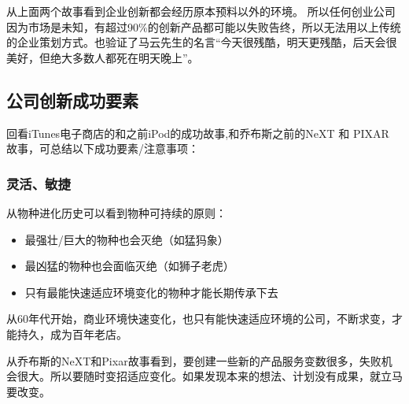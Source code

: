 

从上面两个故事看到企业创新都会经历原本预料以外的环境。
所以任何创业公司因为市场是未知，有超过90\%的创新产品都可能以失败告终，所以无法用以上传统的企业策划方式。也验证了马云先生的名言``今天很残酷，明天更残酷，后天会很美好，但绝大多数人都死在明天晚上''。

\hypertarget{ux516cux53f8ux521bux65b0ux6210ux529fux8981ux7d20}{%
\subsection{公司创新成功要素}\label{ux516cux53f8ux521bux65b0ux6210ux529fux8981ux7d20}}

回看iTunes电子商店的和之前iPod的成功故事,和乔布斯之前的NeXT 和 PIXAR
故事，可总结以下成功要素/注意事项：

\hypertarget{ux7075ux6d3bux654fux6377}{%
\subsubsection{灵活、敏捷}\label{ux7075ux6d3bux654fux6377}}

从物种进化历史可以看到物种可持续的原则：

\begin{itemize}
\tightlist
\item
  最强壮/巨大的物种也会灭绝（如猛犸象）
\item
  最凶猛的物种也会面临灭绝（如狮子老虎）
\item
  只有最能快速适应环境变化的物种才能长期传承下去
\end{itemize}

从60年代开始，商业环境快速变化，也只有能快速适应环境的公司，不断求变，才能持久，成为百年老店。

从乔布斯的NeXT和Pixar故事看到，要创建一些新的产品服务变数很多，失败机会很大。所以要随时变招适应变化。如果发现本来的想法、计划没有成果，就立马要改变。

